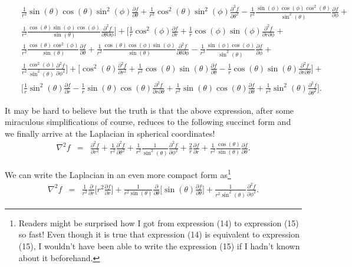 \documentclass[12pt]{article}
\begin{document}
\begin{eqnarray*}
& & \frac{1}{r^2}\sin(\theta)\cos(\theta){\sin}^2(\phi)\frac{\partial f}{\partial\theta} + \frac{1}{r^2}{\cos}^2(\theta){\sin}^2(\phi)\frac{{\partial}^2 f}{\partial{\theta}^2} - \frac{1}{r^2}\frac{\sin(\phi)\cos(\phi){\cos}^2(\theta)}{{\sin}^2(\theta)}\frac{\partial f}{\partial\phi} + \\
& & \frac{1}{r^2}\frac{\cos(\theta)\sin(\phi)\cos(\phi)}{\sin(\theta)}\frac{{\partial}^2 f}{\partial\theta\partial\phi}\Big] + \Big[\frac{1}{r}{\cos}^2(\phi)\frac{\partial f}{\partial r} + \frac{1}{r}\cos(\phi)\sin(\phi)\frac{{\partial}^2 f}{\partial r\partial\phi} + \\
& & \frac{1}{r^2}\frac{\cos(\theta){\cos}^2(\phi)}{\sin(\theta)}\frac{\partial f}{\partial\theta} + \frac{1}{r^2}\frac{\cos(\theta){\cos}(\phi)\sin(\phi)}{\sin(\theta)}\frac{{\partial}^2 f}{\partial\theta\partial\phi} - \frac{1}{r^2}\frac{\sin(\phi)\cos(\phi)}{{\sin}^2(\theta)}\frac{\partial f}{\partial\phi} + \\
& & \frac{1}{r^2}\frac{{\cos}^2(\phi)}{{\sin}^2(\theta)}\frac{{\partial}^2 f}{\partial{\phi}^2}\Big] + \Big[{\cos}^2(\theta)\frac{{\partial}^2 f}{\partial r^2} + \frac{1}{r^2}\cos(\theta)\sin(\theta)\frac{\partial f}{\partial\theta} - \frac{1}{r}\cos(\theta)\sin(\theta)\frac{{\partial}^2 f}{\partial r \partial\theta}\Big] + \\
& & \Big[\frac{1}{r}{\sin}^2(\theta)\frac{\partial f}{\partial r} - \frac{1}{r}\sin(\theta)\cos(\theta)\frac{{\partial}^2 f}{\partial r \partial\theta} + \frac{1}{r^2}\sin(\theta)\cos(\theta)\frac{\partial f}{\partial\theta} + \frac{1}{r^2}{\sin}^2(\theta)\frac{{\partial}^2 f}{\partial{\theta}^2}\Big].
\end{eqnarray*}

It may be hard to believe but the truth is that the above expression, after some miraculous simplifications of course, reduces to the following succinct form and we finally arrive at the Laplacian in spherical coordinates!
\begin{eqnarray}
{\nabla}^2 f &=& \frac{{\partial}^2 f}{\partial r^2} + \frac{1}{r^2}\frac{{\partial}^2 f}{\partial{\theta}^2} + \frac{1}{r^2}\frac{1}{{\sin}^2(\theta)}\frac{{\partial}^2 f}{\partial{\phi}^2} + \frac{2}{r}\frac{\partial f}{\partial r} + \frac{1}{r^2}\frac{\cos(\theta)}{\sin(\theta)}\frac{\partial f}{\partial\theta}.
\end{eqnarray}

We can write the Laplacian in an even more compact form as\footnote[2]{Readers might be surprised how I got from expression (14) to expression (15) so fast! Even though it is true that expression (14) is equivalent to expression (15), I wouldn't have been able to write the expression (15) if I hadn't known about it beforehand.}
\begin{eqnarray}
{\nabla}^2 f &=& \frac{1}{r^2}\frac{\partial}{\partial r}\Big[ r^2\frac{\partial f}{\partial r}\Big] + \frac{1}{r^2\sin(\theta)}\frac{\partial}{\partial\theta}\Big[\sin(\theta)\frac{\partial f}{\partial\theta}\Big] + \frac{1}{r^2{\sin}^2(\theta)}\frac{{\partial}^2 f}{\partial{\phi}^2}.
\end{eqnarray}
\end{document}
